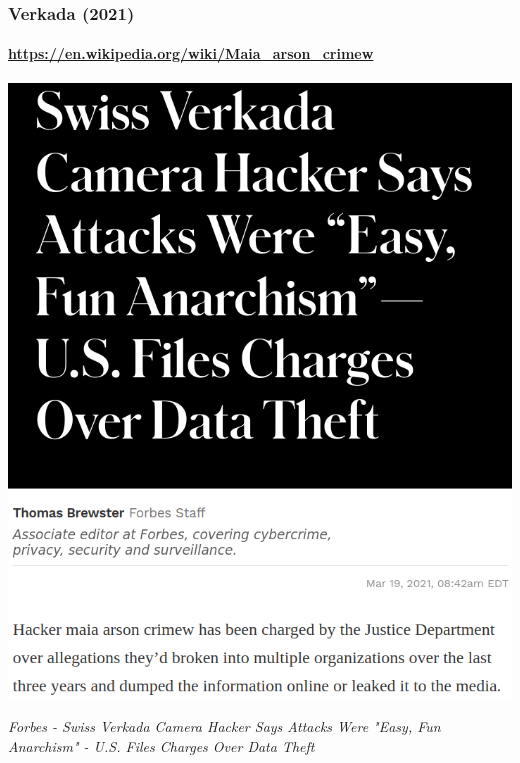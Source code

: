 \documentclass[aspectratio=169,usenames,dvipsnames]{beamer}
\begin{document}
\begin{frame}
  \frametitle{Verkada (2021)}
  \framesubtitle{\url{https://en.wikipedia.org/wiki/Maia_arson_crimew}}

  \centering
  \includegraphics[width=\textwidth,height=0.7\textheight,keepaspectratio]{img/verkada_forbes.png}

  \footnotesize
  \emph{Forbes - Swiss Verkada Camera Hacker Says Attacks Were "Easy, Fun
  Anarchism" - U.S. Files Charges Over Data Theft}

\end{frame}
\end{document}
